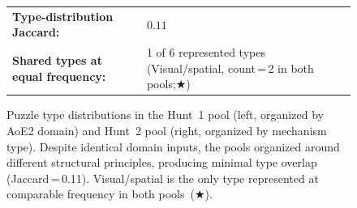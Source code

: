 \begin{figure}[t]
\vspace{2pt}
\noindent\hfill
\begin{minipage}{0.92\linewidth}
  \centering
  \small
  \setlength{\tabcolsep}{10pt}
  \begin{tabular}{ll}
    \textbf{Type-distribution Jaccard:} & $0.11$ \\
    \textbf{Shared types at equal frequency:} & 1 of 6 represented types
      (Visual/spatial, count\,=\,2 in both pools;\;$\bigstar$)
  \end{tabular}
\end{minipage}
\hfill\null
\vspace{4pt}

\caption{Puzzle type distributions in the Hunt~1 pool (left, organized by AoE2
  domain) and Hunt~2 pool (right, organized by mechanism type). Despite
  identical domain inputs, the pools organized around different structural
  principles, producing minimal type overlap (Jaccard\,=\,0.11).
  Visual/spatial is the only type represented at comparable frequency in
  both pools~($\bigstar$).}
\label{fig:pools}
\end{figure}
